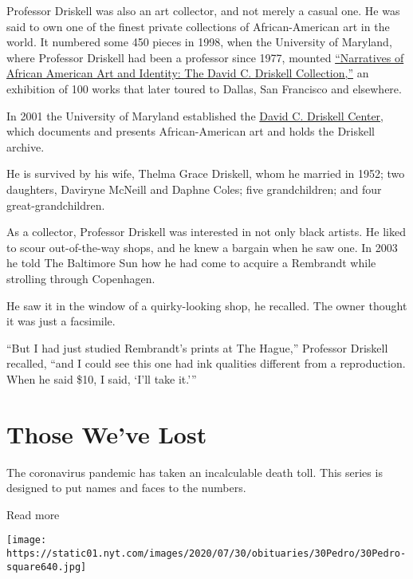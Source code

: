 Professor Driskell was also an art collector, and not merely a casual
one. He was said to own one of the finest private collections of
African-American art in the world. It numbered some 450 pieces in 1998,
when the University of Maryland, where Professor Driskell had been a
professor since 1977, mounted
\href{http://www.tfaoi.com/aa/1aa/1aa644.htm}{``Narratives of African
American Art and Identity: The David C. Driskell Collection,''} an
exhibition of 100 works that later toured to Dallas, San Francisco and
elsewhere.

In 2001 the University of Maryland established the
\href{http://www.driskellcenter.umd.edu/index.php}{David C. Driskell
Center}, which documents and presents African-American art and holds the
Driskell archive.

He is survived by his wife, Thelma Grace Driskell, whom he married in
1952; two daughters, Daviryne McNeill and Daphne Coles; five
grandchildren; and four great-grandchildren.

As a collector, Professor Driskell was interested in not only black
artists. He liked to scour out-of-the-way shops, and he knew a bargain
when he saw one. In 2003 he told The Baltimore Sun how he had come to
acquire a Rembrandt while strolling through Copenhagen.

He saw it in the window of a quirky-looking shop, he recalled. The owner
thought it was just a facsimile.

``But I had just studied Rembrandt's prints at The Hague,'' Professor
Driskell recalled, ``and I could see this one had ink qualities
different from a reproduction. When he said \$10, I said, `I'll take
it.'''

\href{https://www.nytimes.com/interactive/2020/obituaries/people-died-coronavirus-obituaries.html?action=click\&pgtype=Article\&state=default\&region=BELOW_MAIN_CONTENT\&context=covid_obits_promo}{}

\hypertarget{those-weve-lost}{%
\section{Those We've Lost}\label{those-weve-lost}}

The coronavirus pandemic has taken an incalculable death toll. This
series is designed to put names and faces to the numbers.

Read more

\texttt{[image: https://static01.nyt.com/images/2020/07/30/obituaries/30Pedro/30Pedro-square640.jpg]}

